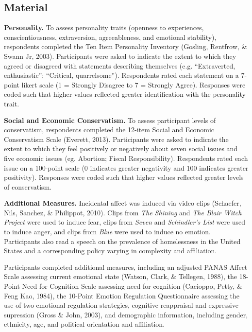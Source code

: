 \documentclass[man]{apa6}
\begin{document}
\hypertarget{material}{%
\subsection{Material}\label{material}}

\textbf{Personality.} To assess personality traits (openness to experiences, conscientiousness, extraversion, agreeableness, and emotional stability), respondents completed the Ten Item Personality Inventory (Gosling, Rentfrow, \& Swann Jr, 2003). Participants were asked to indicate the extent to which they agreed or disagreed with statements describing themselves (e.g. \enquote{Extraverted, enthusiastic}; \enquote{Critical, quarrelsome}). Respondents rated each statement on a 7-point likert scale (1 = Strongly Disagree to 7 = Strongly Agree). Responses were coded such that higher values reflected greater identification with the personality trait.

\textbf{Social and Economic Conservatism.} To assess participant levels of conservatism, respondents completed the 12-item Social and Economic Conservatism Scale (Everett, 2013). Participants were asked to indicate the extent to which they feel positively or negatively about seven social issues and five economic issues (eg. Abortion; Fiscal Responsibility). Respondents rated each issue on a 100-point scale (0 indicates greater negativity and 100 indicates greater positivity). Responses were coded such that higher values reflected greater levels of conservatism.

\textbf{Additional Measures.} Incidental affect was induced via video clips (Schaefer, Nils, Sanchez, \& Philippot, 2010). Clips from \emph{The Shining} and \emph{The Blair Witch Project} were used to induce fear, clips from \emph{Seven} and \emph{Schindler's List} were used to induce anger, and clips from \emph{Blue} were used to induce no emotion. Participants also read a speech on the prevalence of homelessness in the United States and a corresponding policy varying in complexity and affiliation.

Participants completed additional measures, including an adjusted PANAS Affect Scale assessing current emotional state (Watson, Clark, \& Tellegen, 1988), the 18-Point Need for Cognition Scale assessing need for cognition (Cacioppo, Petty, \& Feng Kao, 1984), the 10-Point Emotion Regulation Questionnaire assessing the use of two emotional regulation strategies, cognitive reappraisal and expressive supression (Gross \& John, 2003), and demographic information, including gender, ethnicity, age, and political orientation and affiliation.
\end{document}
